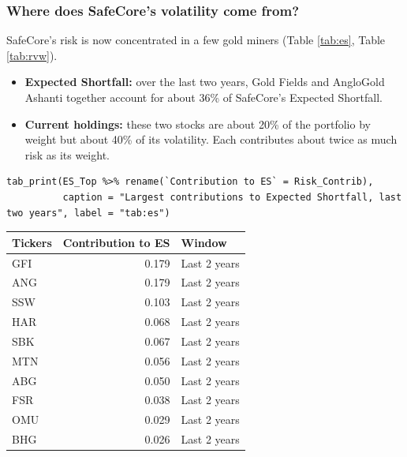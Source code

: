 \documentclass[11pt,preprint]{elsarticle}
\let\origtable\table
\let\endorigtable\endtable
\renewenvironment{table}[1][2] {
    \expandafter\origtable\expandafter[H]
} {
    \endorigtable
}
\numberwithin{equation}{section}
\numberwithin{figure}{section}
\numberwithin{table}{section}
\def\tightlist{} %
\begin{document}
\subsubsection{Where does SafeCore's volatility come
from?}\label{where-does-safecores-volatility-come-from}

SafeCore's risk is now concentrated in a few gold miners (Table
\ref{tab:es}, Table \ref{tab:rvw}).

\begin{itemize}
\tightlist
\item
  \textbf{Expected Shortfall:} over the last two years, Gold Fields and
  AngloGold Ashanti together account for about 36\% of SafeCore's
  Expected Shortfall.
\item
  \textbf{Current holdings:} these two stocks are about 20\% of the
  portfolio by weight but about 40\% of its volatility. Each contributes
  about twice as much risk as its weight.
\end{itemize}

\begin{verbatim}
tab_print(ES_Top %>% rename(`Contribution to ES` = Risk_Contrib),
          caption = "Largest contributions to Expected Shortfall, last two years", label = "tab:es")
\end{verbatim}

\begin{table}[!htbp]
\centering
\caption{Largest contributions to Expected Shortfall, last two years} 
\label{tab:es}
\begingroup\footnotesize
\begin{tabular}{lrl}
  \hline
Tickers & Contribution to ES & Window \\ 
  \hline
GFI & 0.179 & Last 2 years \\ 
  ANG & 0.179 & Last 2 years \\ 
  SSW & 0.103 & Last 2 years \\ 
  HAR & 0.068 & Last 2 years \\ 
  SBK & 0.067 & Last 2 years \\ 
  MTN & 0.056 & Last 2 years \\ 
  ABG & 0.050 & Last 2 years \\ 
  FSR & 0.038 & Last 2 years \\ 
  OMU & 0.029 & Last 2 years \\ 
  BHG & 0.026 & Last 2 years \\ 
   \hline
\end{tabular}
\endgroup
\end{table}
\end{document}

